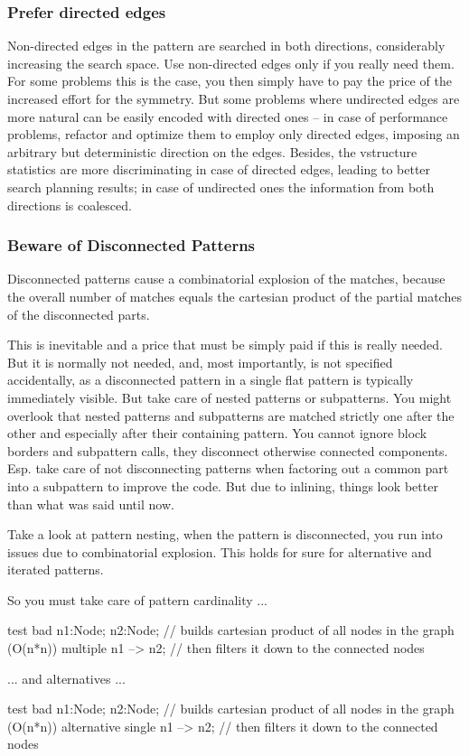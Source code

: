 \subsubsection*{Prefer directed edges}
Non-directed edges in the pattern are searched in both directions, considerably increasing the search space.
Use non-directed edges only if you really need them.
For some problems this is the case, you then simply have to pay the price of the increased effort for the symmetry.
But some problems where undirected edges are more natural can be easily encoded with directed ones -- in case of performance problems, refactor and optimize them to employ only directed edges, imposing an arbitrary but deterministic direction on the edges.
Besides, the vstructure statistics are more discriminating in case of directed edges, leading to better search planning results; in case of undirected ones the information from both directions is coalesced.


\subsubsection*{Beware of Disconnected Patterns}
Disconnected patterns cause a combinatorial explosion of the matches, because the overall number of matches equals the cartesian product of the partial matches of the disconnected parts. 

This is inevitable and a price that must be simply paid if this is really needed.
But it is normally not needed, and, most importantly, is not specified accidentally, as a disconnected pattern in a single flat pattern is typically immediately visible.
But take care of nested patterns or subpatterns.
You might overlook that nested patterns and subpatterns are matched strictly one after the other and especially after their containing pattern.
You cannot ignore block borders and subpattern calls, they disconnect otherwise connected components.
Esp. take care of not disconnecting patterns when factoring out a common part into a subpattern to improve the code.
But due to inlining, things look better than what was said until now.

\begin{example}
Take a look at pattern nesting, when the pattern is disconnected, you run into issues due to combinatorial explosion.
This holds for sure for alternative and iterated patterns.

So you must take care of pattern cardinality ...
\begin{grgen}
test bad {
  n1:Node; n2:Node; // builds cartesian product of all nodes in the graph (O(n*n))
  multiple {
    n1 --> n2; // then filters it down to the connected nodes
  }
}
\end{grgen}
... and alternatives ...
\begin{grgen}
test bad {
  n1:Node; n2:Node; // builds cartesian product of all nodes in the graph (O(n*n))
  alternative {
    single {
      n1 --> n2; // then filters it down to the connected nodes
    }
  }
}
\end{grgen}
\end{example}

